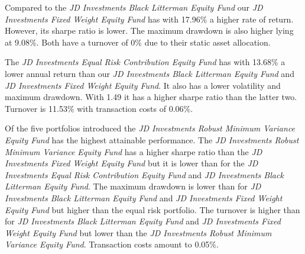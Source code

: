 \documentclass[11pt, parskip=full, DIV=14, headings=small, footsepline, footinclude=false, headsepline]{scrreprt}
\begin{document}
\begin{figure}[h]
\end{figure}


Compared to the \textit{JD Investments Black Litterman Equity Fund} our \textit{JD Investments Fixed Weight Equity Fund} has with 17.96\% a higher rate of return. However, its sharpe ratio is lower. The maximum drawdown is also higher lying at 9.08\%. Both have a turnover of 0\% due to their static asset allocation.

The \textit{JD Investments Equal Risk Contribution Equity Fund} has with 13.68\% a lower annual return than our \textit{JD Investments Black Litterman Equity Fund} and \textit{JD Investments Fixed Weight Equity Fund}. It also has a lower volatility and maximum drawdown. With 1.49 it has a higher sharpe ratio than the latter two. Turnover is 11.53\% with transaction costs of 0.06\%. 

Of the five portfolios introduced the \textit{JD Investments Robust Minimum Variance Equity Fund} has the highest attainable performance. The \textit{JD Investments Robust Minimum Variance Equity Fund} has a higher sharpe ratio than the \textit{JD Investments Fixed Weight Equity Fund} but it is lower than for the \textit{JD Investments Equal Risk Contribution Equity Fund} and \textit{JD Investments Black Litterman Equity Fund}. The maximum drawdown is lower than for \textit{JD Investments Black Litterman Equity Fund} and \textit{JD Investments Fixed Weight Equity Fund} but higher than the equal risk portfolio. The turnover is higher than for \textit{JD Investments Black Litterman Equity Fund} and \textit{JD Investments Fixed Weight Equity Fund} but lower than the \textit{JD Investments Robust Minimum Variance Equity Fund}. Transaction costs amount to 0.05\%.
\end{document}
